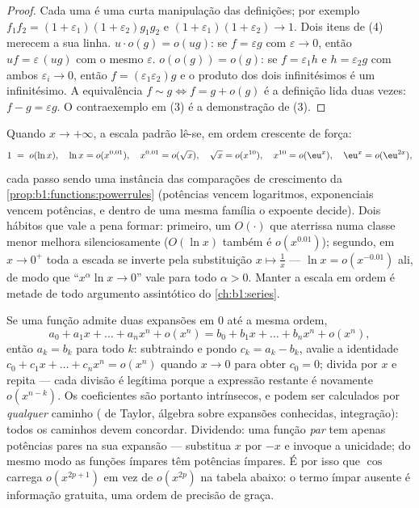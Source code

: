 \begin{proof}
Cada uma é uma curta manipulação das definições; por exemplo
$f_1 f_2 = (1+\varepsilon_1)(1+\varepsilon_2) g_1 g_2$ e $(1 +
\varepsilon_1)(1+\varepsilon_2) \to 1$. Dois itens de (4) merecem
a sua linha. $u\cdot o(g) = o(ug)$: se $f = \varepsilon g$ com
$\varepsilon \to 0$, então $uf = \varepsilon\,(ug)$ com o mesmo
$\varepsilon$. $o(o(g)) = o(g)$: se $f = \varepsilon_1 h$ e
$h = \varepsilon_2 g$ com ambos $\varepsilon_i \to 0$, então $f =
(\varepsilon_1\varepsilon_2) g$ e o produto dos dois
infinitésimos é um infinitésimo. A equivalência $f \sim g \iff f = g +
o(g)$ é a definição lida duas vezes: $f - g = \varepsilon g$.
O contraexemplo em (3) é a demonstração de (3).
\end{proof}

\begin{example}\label{ex:b1:taylor:scale}
Quando $x \to +\infty$, a escala padrão lê-se, em ordem crescente
de força:
\[
1 \;=\; o(\ln x), \quad
\ln x = o(x^{0.01}), \quad
x^{0.01} = o(\sqrt x), \quad
\sqrt x = o(x^{10}), \quad
x^{10} = o(\eu^{x}), \quad
\eu^x = o(\eu^{2x}) ,
\]
cada passo sendo uma instância das comparações de crescimento da
\cref{prop:b1:functions:powerrules} (potências vencem logaritmos,
exponenciais vencem potências, e dentro de uma mesma família o expoente
decide). Dois hábitos que vale a pena formar: primeiro, um $O(\cdot)$ que
aterrissa numa classe menor melhora silenciosamente ($O(\ln x)$ também é
$o(x^{0.01})$); segundo, em $x \to 0^+$ toda a escada
se inverte pela substituição $x \mapsto \frac1x$ ---
$\ln x = o(x^{-0.01})$ ali, de modo que ``$x^\alpha \ln x \to 0$''
vale para todo $\alpha > 0$. Manter a escala em ordem é
metade de todo argumento assintótico do
\cref{ch:b1:series}.
\end{example}

\begin{example}\label{ex:b1:taylor:uniqueness}
Se uma função admite duas expansões em $0$ até a mesma ordem,
\[
a_0 + a_1 x + \dots + a_n x^n + o(x^n)
= b_0 + b_1 x + \dots + b_n x^n + o(x^n),
\]
então $a_k = b_k$ para todo $k$: subtraindo e pondo $c_k =
a_k - b_k$, avalie a
identidade $c_0 + c_1 x + \dots + c_n x^n
= o(x^n)$ quando $x \to 0$ para obter $c_0 = 0$; divida
por $x$ e repita --- cada divisão é legítima porque a expressão
restante é novamente $o(x^{n-k})$. Os coeficientes são portanto
intrínsecos, e podem ser calculados por \emph{qualquer} caminho
( de Taylor, álgebra sobre expansões conhecidas, integração):
todos os caminhos devem concordar. Dividendo: uma função \emph{par}
tem apenas potências pares na sua expansão --- substitua $x$ por $-x$ e
invoque a unicidade; do mesmo modo as funções ímpares têm potências
ímpares. É por isso que $\cos$ carrega $o(x^{2p+1})$ em vez de $o(x^{2p})$ na
tabela abaixo: o termo ímpar ausente é informação gratuita, uma ordem
de precisão de graça.
\end{example}

